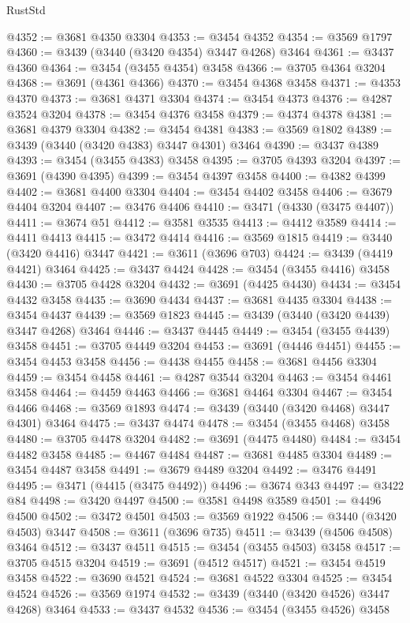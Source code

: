 \begin{lexlean}{RustStd}
\begin{coremodule}
{{{{{{{{{{{{{{{{{{{@4352 := @3681 @4350 @3304
@4353 := @3454 @4352
@4354 := @3569 @1797
@4360 := @3439 (@3440 (@3420 @4354) @3447 @4268) @3464
@4361 := @3437 @4360
@4364 := @3454 (@3455 @4354) @3458
@4366 := @3705 @4364 @3204
@4368 := @3691 (@4361 @4366)
@4370 := @3454 @4368 @3458
@4371 := @4353 @4370
@4373 := @3681 @4371 @3304
@4374 := @3454 @4373
@4376 := @4287 @3524 @3204
@4378 := @3454 @4376 @3458
@4379 := @4374 @4378
@4381 := @3681 @4379 @3304
@4382 := @3454 @4381
@4383 := @3569 @1802
@4389 := @3439 (@3440 (@3420 @4383) @3447 @4301) @3464
@4390 := @3437 @4389
@4393 := @3454 (@3455 @4383) @3458
@4395 := @3705 @4393 @3204
@4397 := @3691 (@4390 @4395)
@4399 := @3454 @4397 @3458
@4400 := @4382 @4399
@4402 := @3681 @4400 @3304
@4404 := @3454 @4402 @3458
@4406 := @3679 @4404 @3204
@4407 := @3476 @4406
@4410 := @3471 (@4330 (@3475 @4407))
@4411 := @3674 @51
@4412 := @3581 @3535
@4413 := @4412 @3589
@4414 := @4411 @4413
@4415 := @3472 @4414
@4416 := @3569 @1815
@4419 := @3440 (@3420 @4416) @3447
@4421 := @3611 (@3696 @703)
@4424 := @3439 (@4419 @4421) @3464
@4425 := @3437 @4424
@4428 := @3454 (@3455 @4416) @3458
@4430 := @3705 @4428 @3204
@4432 := @3691 (@4425 @4430)
@4434 := @3454 @4432 @3458
@4435 := @3690 @4434
@4437 := @3681 @4435 @3304
@4438 := @3454 @4437
@4439 := @3569 @1823
@4445 := @3439 (@3440 (@3420 @4439) @3447 @4268) @3464
@4446 := @3437 @4445
@4449 := @3454 (@3455 @4439) @3458
@4451 := @3705 @4449 @3204
@4453 := @3691 (@4446 @4451)
@4455 := @3454 @4453 @3458
@4456 := @4438 @4455
@4458 := @3681 @4456 @3304
@4459 := @3454 @4458
@4461 := @4287 @3544 @3204
@4463 := @3454 @4461 @3458
@4464 := @4459 @4463
@4466 := @3681 @4464 @3304
@4467 := @3454 @4466
@4468 := @3569 @1893
@4474 := @3439 (@3440 (@3420 @4468) @3447 @4301) @3464
@4475 := @3437 @4474
@4478 := @3454 (@3455 @4468) @3458
@4480 := @3705 @4478 @3204
@4482 := @3691 (@4475 @4480)
@4484 := @3454 @4482 @3458
@4485 := @4467 @4484
@4487 := @3681 @4485 @3304
@4489 := @3454 @4487 @3458
@4491 := @3679 @4489 @3204
@4492 := @3476 @4491
@4495 := @3471 (@4415 (@3475 @4492))
@4496 := @3674 @343
@4497 := @3422 @84
@4498 := @3420 @4497
@4500 := @3581 @4498 @3589
@4501 := @4496 @4500
@4502 := @3472 @4501
@4503 := @3569 @1922
@4506 := @3440 (@3420 @4503) @3447
@4508 := @3611 (@3696 @735)
@4511 := @3439 (@4506 @4508) @3464
@4512 := @3437 @4511
@4515 := @3454 (@3455 @4503) @3458
@4517 := @3705 @4515 @3204
@4519 := @3691 (@4512 @4517)
@4521 := @3454 @4519 @3458
@4522 := @3690 @4521
@4524 := @3681 @4522 @3304
@4525 := @3454 @4524
@4526 := @3569 @1974
@4532 := @3439 (@3440 (@3420 @4526) @3447 @4268) @3464
@4533 := @3437 @4532
@4536 := @3454 (@3455 @4526) @3458
}}}}}}}}}}}}}}}}}}}
\end{coremodule}
\end{lexlean}
